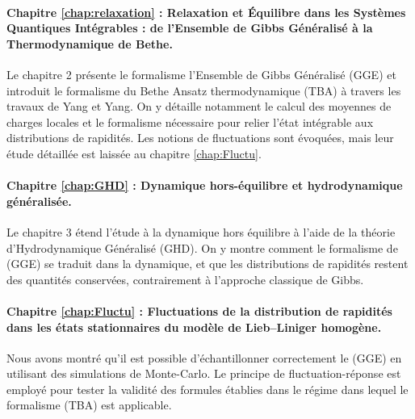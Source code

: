 \paragraph*{Chapitre \ref{chap:relaxation} : Relaxation et Équilibre dans les Systèmes Quantiques Intégrables : de l’Ensemble de Gibbs Généralisé à la Thermodynamique de Bethe.}  
Le chapitre 2 présente le formalisme l'Ensemble de Gibbs Généralisé (\acrshort{GGE}) et introduit le formalisme du Bethe Ansatz thermodynamique (\acrshort{TBA}) à travers les travaux de Yang et Yang. On y détaille notamment le calcul des moyennes de charges locales et le formalisme nécessaire pour relier l’état intégrable aux distributions de rapidités. Les notions de fluctuations sont évoquées, mais leur étude détaillée est laissée au chapitre \ref{chap:Fluctu}.


\paragraph*{Chapitre \ref{chap:GHD} : Dynamique hors-équilibre et hydrodynamique généralisée.}  
Le chapitre 3 étend l’étude à la dynamique hors équilibre à l’aide de la théorie d'Hydrodynamique Généralisé (\acrshort{GHD}). On y montre comment le formalisme de (\acrshort{GGE}) se traduit dans la dynamique, et que les distributions de rapidités restent des quantités conservées, contrairement à l’approche classique de Gibbs.


\paragraph*{Chapitre \ref{chap:Fluctu} : Fluctuations de la distribution de rapidités dans les états stationnaires du modèle de Lieb–Liniger homogène.}  
Nous avons montré qu'il est possible d'échantillonner correctement le (\acrshort{GGE}) en utilisant des simulations de Monte-Carlo. Le principe de fluctuation-réponse est employé pour tester la validité des formules établies dans le régime dans lequel le formalisme (\acrshort{TBA}) est applicable.



